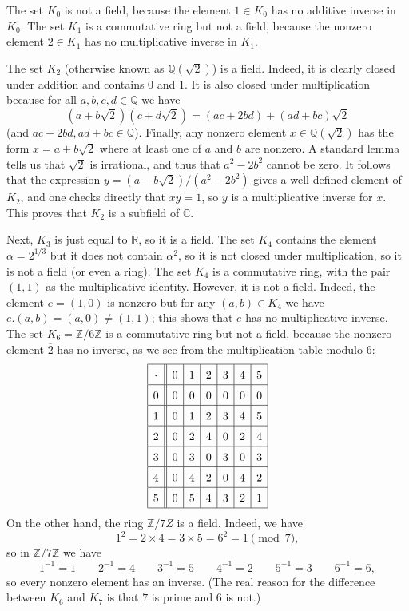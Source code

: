 \documentclass{amsart}
\newcommand{\Z}         {{\mathbb{Z}}}
\newcommand{\Q}         {{\mathbb{Q}}}
\newcommand{\R}         {{\mathbb{R}}}
\newcommand{\C}         {{\mathbb{C}}}
\newcommand{\al}        {\alpha}
\newcommand{\ov}[1]     {\overline{#1}}
\newcommand{\tm}        {\times}
\renewcommand{\:}{\colon}
\newenvironment{solution}{\SolutionInline}{\endSolutionInline}
\theoremstyle{definition}
\renewenvironment{solution}{\SolutionAtEnd}{\endSolutionAtEnd}
\begin{document}
\begin{solution}
 The set $K_0$ is not a field, because the element $1\in K_0$ has no
 additive inverse in $K_0$.  The set $K_1$ is a commutative ring but
 not a field, because the nonzero element $2\in K_1$ has no
 multiplicative inverse in $K_1$.  

 The set $K_2$ (otherwise known as
 $\Q(\sqrt{2})$) is a field.  Indeed, it is clearly closed under
 addition and contains $0$ and $1$.  It is also closed under
 multiplication because for all $a,b,c,d\in\Q$ we have 
 \[ (a+b\sqrt{2})(c+d\sqrt{2})=(ac+2bd)+(ad+bc)\sqrt{2} \]
 (and $ac+2bd,ad+bc\in\Q$).  Finally, any nonzero element
 $x\in\Q(\sqrt{2})$ has the form $x=a+b\sqrt{2}$ where at least one of
 $a$ and $b$ are nonzero.  A standard lemma tells us that $\sqrt{2}$
 is irrational, and thus that $a^2-2b^2$ cannot be zero.  It follows
 that the expression $y=(a-b\sqrt{2})/(a^2-2b^2)$ gives a well-defined
 element of $K_2$, and one checks directly that $xy=1$, so $y$ is a
 multiplicative inverse for $x$.  This proves that $K_2$ is a subfield
 of $\C$.  

 Next, $K_3$ is just equal to $\R$, so it is a field.  The set $K_4$
 contains the element $\al=2^{1/3}$ but it does not contain $\al^2$,
 so it is not closed under multiplication, so it is not a field (or
 even a ring).  The set $K_4$ is a commutative ring, with the pair
 $(1,1)$ as the multiplicative identity.  However, it is not a field.
 Indeed, the element $e=(1,0)$ is nonzero but for any $(a,b)\in K_4$
 we have $e.(a,b)=(a,0)\neq(1,1)$; this shows that $e$ has no
 multiplicative inverse.  The set $K_6=\Z/6\Z$ is a commutative ring
 but not a field, because the nonzero element $\ov{2}$ has no
 inverse, as we see from the multiplication table modulo $6$:
 \[ \renewcommand{\arraystretch}{1.5}
   \begin{array}{|c||c|c|c|c|c|c|}
    \hline
     \cdot & 0 & 1 & 2 & 3 & 4 & 5 \\ \hline
     0     & 0 & 0 & 0 & 0 & 0 & 0 \\ \hline
     1     & 0 & 1 & 2 & 3 & 4 & 5 \\ \hline
     2     & 0 & 2 & 4 & 0 & 2 & 4 \\ \hline
     3     & 0 & 3 & 0 & 3 & 0 & 3 \\ \hline
     4     & 0 & 4 & 2 & 0 & 4 & 2 \\ \hline
     5     & 0 & 5 & 4 & 3 & 2 & 1 \\ \hline
   \end{array}
 \]
 On the other hand, the ring $\Z/7Z$ is a field.  Indeed, we have 
 \[ 1^2 = 2\tm 4 = 3 \tm 5 = 6^2 = 1 \pmod{7}, \]
 so in $\Z/7\Z$ we have 
 \[ 1^{-1} = 1 \qquad
    2^{-1} = 4 \qquad
    3^{-1} = 5 \qquad
    4^{-1} = 2 \qquad
    5^{-1} = 3 \qquad
    6^{-1} = 6,
 \]
 so every nonzero element has an inverse.  (The real reason for the
 difference between $K_6$ and $K_7$ is that $7$ is prime and $6$ is
 not.) 
\end{solution}
\end{document}
